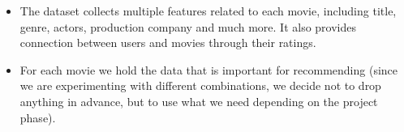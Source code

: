 \begin{itemize}
	\item The dataset collects multiple features related to each movie, including title, genre, actors, production company and much more. It also provides connection between users and movies through their ratings.
	\item For each movie we hold the data that is important for recommending (since we are experimenting with different combinations, we decide not to drop anything in advance, but to use what we need depending on the project phase).
\end{itemize}
